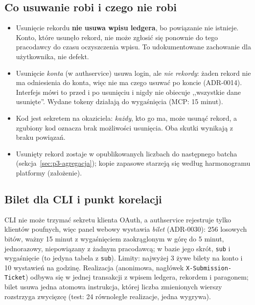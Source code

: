 \subsection{Co usuwanie robi i czego nie robi}

\begin{itemize}[leftmargin=*]
    \item Usunięcie rekordu \textbf{nie usuwa wpisu ledgera}, bo powiązanie nie
    istnieje. Konto, które usunęło rekord, nie może zgłosić się ponownie do
    tego pracodawcy do czasu oczyszczenia wpisu. To udokumentowane zachowanie dla
    użytkownika, nie defekt.
    \item Usunięcie \emph{konta} (w authservice) usuwa login, ale \emph{nie
    rekordy}: żaden rekord nie ma odniesienia do konta, więc nie ma czego
    usuwać po koncie (ADR-0014). Interfejs mówi to przed i po usunięciu i
    nigdy nie obiecuje ,,wszystkie dane usunięte''. Wydane tokeny działają do
    wygaśnięcia (MCP: 15 minut).
    \item Kod jest sekretem na okaziciela: \emph{każdy}, kto go ma, może usunąć
    rekord, a zgubiony kod oznacza brak możliwości usunięcia. Oba skutki
    wynikają z braku powiązań.
    \item Usunięty rekord zostaje w opublikowanych liczbach do następnego
    batcha (sekcja~\ref{sec:p3-agregacja}); kopie zapasowe starzeją się według
    harmonogramu platformy (założenie).
\end{itemize}

\subsection{Bilet dla CLI i punkt korelacji}

CLI nie może trzymać sekretu klienta OAuth, a authservice rejestruje tylko
klientów poufnych, więc panel webowy wystawia \emph{bilet} (ADR-0030): 256 losowych
bitów, ważny 15 minut z wygaśnięciem zaokrąglonym w górę do 5 minut, jednorazowy,
niepowiązany z żadnym pracodawcą; w bazie jego skrót, \texttt{sub} i wygaśnięcie
(to jedyna tabela z \texttt{sub}). Limity: najwyżej 3 żywe bilety na konto i 10
wystawień na godzinę. Realizacja (anonimowa, nagłówek
\texttt{X-Submission-Ticket}) odbywa się w jednej transakcji z wpisem ledgera,
rekordem i paragonem; bilet usuwa jedna atomowa instrukcja, której liczba
zmienionych wierszy rozstrzyga zwycięzcę (test: 24 równoległe realizacje, jedna
wygrywa).

